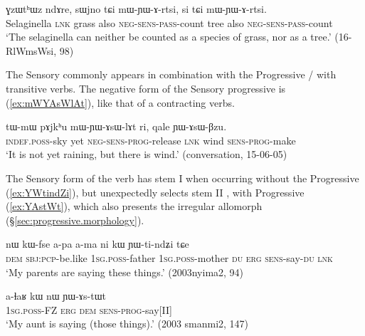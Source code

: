 \begin{exe}
\ex \label{ex:mWYArtsi}
\gll ɣzɯtʰɯz ndɤre, sɯjno tɕi mɯ-ɲɯ-ɤ-rtsi, si tɕi mɯ-ɲɯ-ɤ-rtsi. \\
Selaginella \textsc{lnk} grass also \textsc{neg}-\textsc{sens}-\textsc{pass}-count tree also \textsc{neg}-\textsc{sens}-\textsc{pass}-count \\
\glt `The selaginella can neither be counted as a species of grass, nor as a tree.' (16-RlWmsWsi, 98)
\end{exe}

The Sensory commonly appears in combination with the Progressive / with transitive verbs. The negative form of the Sensory progressive is  (\ref{ex:mWYAsWlAt}), like that of a contracting verbs.

\begin{exe}
\ex \label{ex:mWYAsWlAt}
\gll   tɯ-mɯ pɤjkʰu mɯ-ɲɯ-ɤsɯ-lɤt ri, qale ɲɯ-ɤsɯ-βzu.\\
\textsc{indef}.\textsc{poss}-sky yet \textsc{neg}-\textsc{sens}-\textsc{prog}-release \textsc{lnk} wind \textsc{sens}-\textsc{prog}-make\\
\glt `It is not yet raining, but there is wind.' (conversation, 15-06-05)
\end{exe}

The Sensory form of the verb  has stem I  when occurring without the Progressive (\ref{ex:YWtindZi}), but unexpectedly selects stem II ,  with Progressive (\ref{ex:YAstWt}), which also presents the irregular allomorph  (§\ref{sec:progressive.morphology}).
 

\begin{exe}
\ex \label{ex:YWtindZi}
\gll nɯ kɯ-fse a-pa a-ma ni kɯ ɲɯ-ti-ndʑi tɕe \\
\textsc{dem} \textsc{sbj}:\textsc{pcp}-be.like \textsc{1sg}.\textsc{poss}-father \textsc{1sg}.\textsc{poss}-mother \textsc{du} \textsc{erg} \textsc{sens}-say-\textsc{du} \textsc{lnk} \\
\glt `My parents are saying these things.' (2003nyima2, 94)
\end{exe}

\begin{exe}
\ex \label{ex:YAstWt}
\gll a-ɬaʁ kɯ nɯ ɲɯ-ɤs-tɯt \\
\textsc{1sg}.\textsc{poss}-FZ \textsc{erg} \textsc{dem} \textsc{sens}-\textsc{prog}-say[II] \\
\glt `My aunt is saying (those things).' (2003 smanmi2, 147)
\end{exe}

